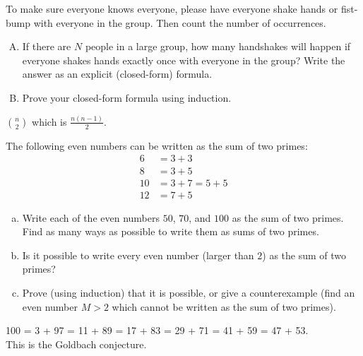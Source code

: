 \documentclass[11pt]{exam}
\begin{document}
\begin{questions}
\question
To make sure everyone knows everyone, 
please have everyone shake hands or fist-bump with everyone in the group. Then count the number of occurrences.
\begin{enumerate}[A.)]
\item If there are $N$ people in a large group, how many handshakes will happen if everyone shakes hands exactly once with everyone in the group? Write the answer as an explicit (closed-form) formula.
\item Prove your closed-form formula using induction.
\end{enumerate}
%
%
% 
%
%
\begin{solution}
${n \choose 2}$ which is $\displaystyle \frac{n(n-1)}{2}$.
\end{solution}


\question 
The following even numbers can be written as the sum of two primes:
\begin{align*}
6 &= 3 + 3 \\
8 &= 3 + 5 \\
10 &= 3 + 7 = 5 + 5 \\
12 &= 7 + 5
\end{align*}

\begin{enumerate}[a.]
\item Write each of the even numbers $50$, $70$, and $100$ as the sum of two primes. Find as many ways as possible to write them as sums of two primes.

\item Is it possible to write every even number (larger than $2$) as the sum of two primes? 
\item Prove (using induction) that it is possible, or give a counterexample (find an even number $M>2$ which cannot be written as the sum of two primes).
\end{enumerate}

\begin{solution}
100 = 3 + 97 = 11 + 89 = 17 + 83 = 29 + 71 = 41 + 59 = 47 + 53.\\
This is the Goldbach conjecture.
\end{solution}


\end{questions}
\end{document}
